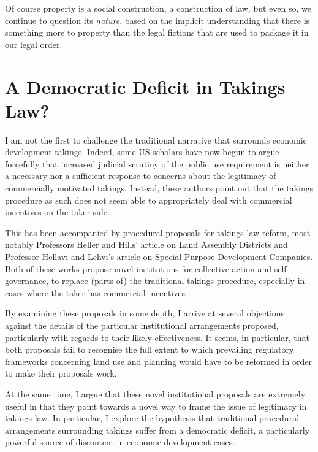 \documentclass{article} %
\begin{document}
{Of course property is a social construction, a construction of law, but even so, we continue to question its {\it nature}, based on the implicit understanding that there is something more to property than the legal fictions that are used to package it in our legal order.
}

\section{A Democratic Deficit in Takings Law?}

I am not the first to challenge the traditional narrative that surrounds economic development takings. Indeed, some US scholars have now begun to argue forcefully that increased judicial scrutiny of the public use requirement is neither a necessary nor a sufficient response to concerns about the legitimacy of commercially motivated takings. Instead, these authors point out that the takings procedure as such does not seem able to appropriately deal with commercial incentives on the taker side.

This has been accompanied by procedural proposals for takings law reform, most notably Professors Heller and Hills' article on Land Assembly Districts and Professor Hellavi and Lehvi's article on Special Purpose Development Companies. Both of these works propose novel institutions for collective action and self-governance, to replace (parts of) the traditional takings procedure, especially in cases where the taker has commercial incentives.

By examining these proposals in some depth, I arrive at several objections against the details of the particular institutional arrangements proposed, particularly with regards to their likely effectiveness. It seems, in particular, that both proposals fail to recognise the full extent to which prevailing regulatory frameworks concerning land use and planning would have to be reformed in order to make their proposals work.

At the same time, I argue that these novel institutional proposals are extremely useful in that they point towards a novel way to frame the issue of legitimacy in takings law. In particular, I explore the hypothesis that traditional procedural arrangements surrounding takings suffer from a democratic deficit, a particularly powerful source of discontent in economic development cases.
\end{document}
